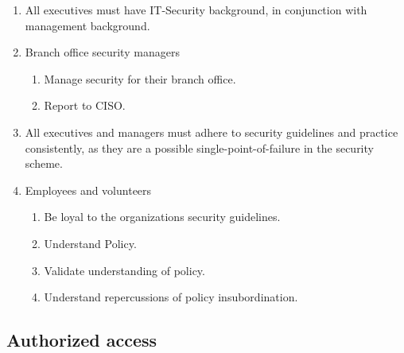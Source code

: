 \begin{enumerate}
\begin{enumerate}
  \end{enumerate}
  \item All executives must have IT-Security background, in conjunction with management background.
  \item Branch office security managers
  \begin{enumerate}
     \item Manage security for their branch office.
     \item Report to CISO.
  \end{enumerate}
  \item All executives and managers must adhere to security guidelines and practice consistently, as they are a possible single-point-of-failure in the security scheme.
  \item Employees and volunteers
  \begin{enumerate}
    \item Be loyal to the organizations security guidelines.
    \item Understand Policy.
    \item Validate understanding of policy.
    \item Understand repercussions of policy insubordination.
  \end{enumerate}
\end{enumerate}

\subsection{Authorized access}

